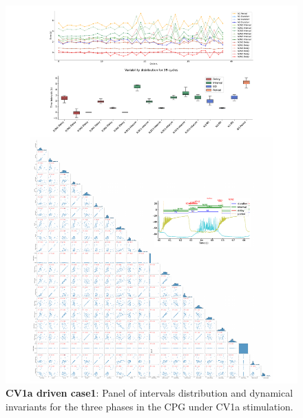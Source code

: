 \begin{figure}[htbp]
	\centering
	\includegraphics[width=1.1\textwidth]{./invariants/data/SUSSEX/CV1a_driven1/images/3phases/panel_with_pairplot.pdf}
	\caption{\textbf{CV1a driven case1}: Panel of intervals distribution and dynamical invariants for the three phases in the CPG under CV1a stimulation.}
	\label{fig:cv1a 1 3phases pairplot}
\end{figure}

